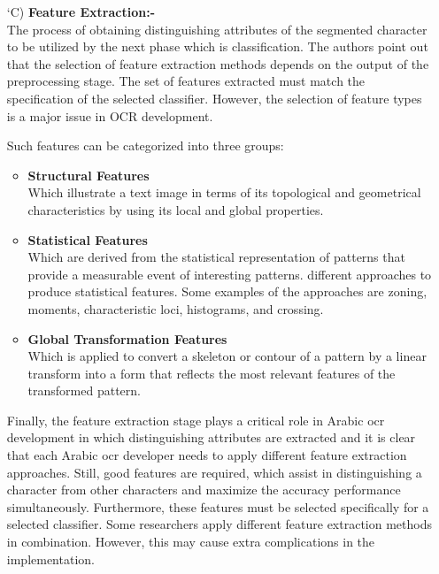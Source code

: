 \begin{itemize}[labelindent=1em,labelsep=0.25cm,leftmargin=*]
        \item[\char `C)] \textbf{Feature Extraction:-}\\
        The process of obtaining distinguishing attributes of the segmented character to be utilized by the next phase which is classification. The authors point out that the selection of feature extraction methods depends on the output of the preprocessing stage. The set of features extracted must match the specification of the selected classifier. However, the selection of feature types is a major issue in OCR development.

Such features can be categorized into three groups: 
\begin{itemize}[itemsep=1pt, topsep=5pt]
    \item \textbf{Structural Features}\\ Which illustrate a text image in terms of its topological and geometrical characteristics by using its local and global properties.

    \item \textbf{Statistical Features}\\ Which are derived from the statistical representation of patterns that provide a measurable event of interesting patterns. different approaches to produce statistical features. Some examples of the approaches are zoning, moments, characteristic loci, histograms, and crossing.

     \item \textbf{Global Transformation Features}\\ Which is applied to convert a skeleton or contour of a pattern by a linear transform into a form that reflects the most relevant features of the transformed pattern.
\end{itemize}

Finally, the feature extraction stage plays a critical role in Arabic  \acrshort{ocr} development in which distinguishing attributes are extracted and it is clear that each Arabic \acrshort{ocr} developer needs to apply different feature extraction approaches. Still, good features are required, which assist in distinguishing a character from other characters and maximize the accuracy performance simultaneously. Furthermore, these features must be selected specifically for a selected classifier. Some researchers apply different feature extraction methods in combination. However, this may cause extra complications in the implementation.

     
        

\end{itemize}
